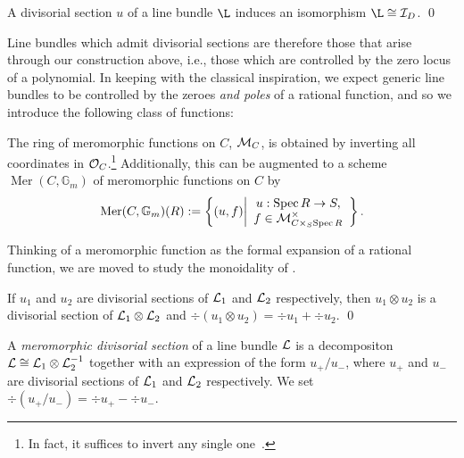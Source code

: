 \begin{lemma}
A divisorial section $u$ of a line bundle $\L$ induces an isomorphism $\L \cong \sheaf I_D$. \qed
\end{lemma}

Line bundles which admit divisorial sections are therefore those that arise through our construction above, i.e., those which are controlled by the zero locus of a polynomial.  In keeping with the classical inspiration, we expect generic line bundles to be controlled by the zeroes \emph{and poles} of a rational function, and so we introduce the following class of functions:

\begin{definition}
The ring of meromorphic functions on $C$, $\mathcal{M}_C$, is obtained by inverting all coordinates in $\mathcal{O}_C$.\footnote{In fact, it suffices to invert any single one~\cite[Lemma 5.21]{StricklandFSFG}.}  Additionally, this can be augmented to a scheme $\operatorname{Mer}(C, \mathbb G_m)$ of meromorphic functions on $C$ by \[\operatorname{Mer}(C, \mathbb G_m)(R) := \left\{ (u, f) \middle| \begin{array}{c} u: \operatorname{Spec} R \to S, \\ f \in \mathcal{M}^\times_{C \times_S \operatorname{Spec} R} \end{array} \right\}.\]
\end{definition}

Thinking of a meromorphic function as the formal expansion of a rational function, we are moved to study the monoidality of .

\begin{lemma}
If $u_1$ and $u_2$ are divisorial sections of $\mathcal{L}_1$ and $\mathcal{L}_2$ respectively, then $u_1 \otimes u_2$ is a divisorial section of $\mathcal{L}_1 \otimes \mathcal{L}_2$ and $\div(u_1 \otimes u_2) = \div u_1 + \div u_2$. \qed
\end{lemma}

\begin{definition}
A \textit{meromorphic divisorial section} of a line bundle $\mathcal{L}$ is a decompositon $\mathcal{L} \cong \mathcal{L}_1 \otimes \mathcal{L}_2^{-1}$ together with an expression of the form $u_+ / u_-$, where $u_+$ and $u_-$ are divisorial sections of $\mathcal{L}_1$ and $\mathcal{L}_2$ respectively.  We set $\div(u_+ / u_-) = \div u_+ - \div u_-$.
\end{definition}

